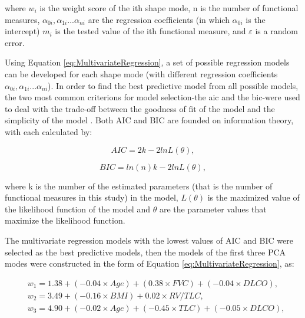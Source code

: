 \noindent where $w_i$ is the weight score of the ith shape mode, n is the number of functional measures, $\alpha_{0i}, \alpha_{1i} ... \alpha_{ni}$ are the regression coefficients (in which $\alpha_{0i}$ is the intercept) $m_i$ is the tested value of the ith functional measure, and $\varepsilon$ is a random error. 

Using Equation \ref{eq:MultivariateRegression}, a set of possible regression models can be developed for each shape mode (with different regression coefficients $\alpha_{0i}, \alpha_{1i} ... \alpha_{ni}$). In order to find the best predictive model from all possible models, the two most common criterions for model selection-the \gls{aic} and the \gls{bic}-were used to deal with the trade-off between the goodness of fit of the model and the simplicity of the model \citep{aho2014model}. Both AIC and BIC are founded on information theory, with each calculated by:

\begin{equation}
 \label{eq:AIC}
 AIC = 2k - 2lnL(\theta),
\end{equation}

\begin{equation}
 \label{eq:BIC}
 BIC = ln(n)k - 2lnL(\theta),
\end{equation}

\noindent where k is the number of the estimated parameters (that is the number of functional measures in this study) in the model, $L(\theta)$ is the maximized value of the likelihood function of the model and $\theta$ are the parameter values that maximize the likelihood function.

The multivariate regression models with the lowest values of AIC and BIC were selected as the best predictive models, then the models of the first three PCA modes were constructed in the form of Equation \ref{eq:MultivariateRegression}, as:

\begin{equation} 
 \label{eq:TerminalBoundaryCondition}
 \begin{split}
 & w_1 = 1.38 + (-0.04 \times Age) + (0.38 \times FVC) + (-0.04 \times DLCO), \\
 & w_2 = 3.49 + (-0.16 \times BMI) + 0.02 \times RV/TLC, \\
 & w_3 = 4.90 + (-0.02 \times Age) + (-0.45 \times TLC) + (-0.05 \times DLCO), \\
 \end{split}
\end{equation}
 
